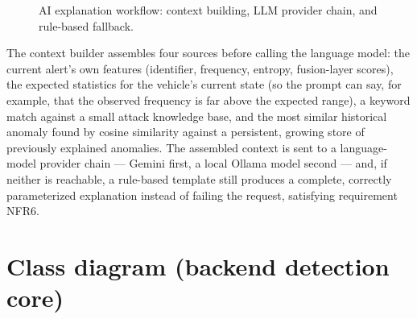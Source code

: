 \begin{figure}[H]
\centering
{}
\caption{AI explanation workflow: context building, LLM provider chain, and rule-based fallback.}
\label{fig:ai-workflow}
\end{figure}

The context builder assembles four sources before calling the language model: the current alert's own features (identifier, frequency, entropy, fusion-layer scores), the expected statistics for the vehicle's current state (so the prompt can say, for example, that the observed frequency is far above the expected range), a keyword match against a small attack knowledge base, and the most similar historical anomaly found by cosine similarity against a persistent, growing store of previously explained anomalies. The assembled context is sent to a language-model provider chain — Gemini first, a local Ollama model second — and, if neither is reachable, a rule-based template still produces a complete, correctly parameterized explanation instead of failing the request, satisfying requirement NFR6.

\section{Class diagram (backend detection core)}

